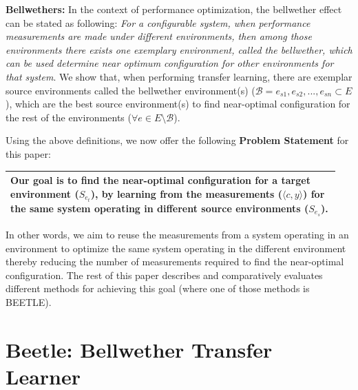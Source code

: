 \documentclass[10pt,journal,compsoc]{IEEEtran}
\begin{document}
\noindent\textbf{Bellwethers: }
In the context of performance optimization, the bellwether  effect can be stated as following: \textit{For a configurable system, when performance measurements are made 
    under 
    different environments, then
     among those environments there exists one exemplary environment, called 
    the bellwether, which can be used determine near optimum configuration for 
    other environments for that system}.
We show that, when performing transfer 
learning, there are exemplar source environments called the bellwether 
environment(s) ($\mathcal{B}={e_{s1}, e_{s2},...,e_{sn}}\subset E$), which 
are the best source environment(s) to find near-optimal configuration for the 
rest of the environments ($\forall e \in E\setminus \mathcal{B}$). 


Using the above definitions, we now offer the following  \textbf{Problem Statement} 
for this paper:\\

 
\noindent\begin{minipage}{\linewidth}
    \begin{center}
    \begin{tabular}{|p{0.95\linewidth}|}
    \hline
         \rowcolor[HTML]{FFFFFF}
        Our goal is to find the near-optimal 
configuration for a target environment ($S_{e_t}$), by learning from the measurements ($\langle c,y\rangle$) for the same system operating in different source environments ($S_{e_s}$). 
\\\hline
    \end{tabular}
    \end{center}
\end{minipage}
\vspace{1mm} 

In other words, we aim to reuse the measurements from a system operating in an environment to optimize the same system operating in the different environment thereby reducing the number of measurements required to find the near-optimal configuration.
The rest of this paper describes and comparatively evaluates
different methods for achieving this goal (where one of those
methods is  BEETLE).


\section{{\large Beetle: Bellwether Transfer Learner}}
\label{sect:beetle}


\end{document}
